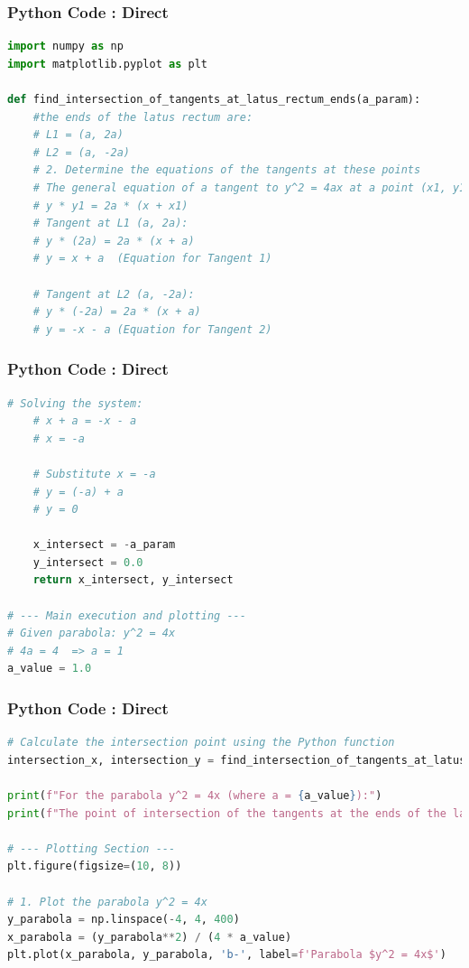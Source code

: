 \documentclass{beamer}
\begin{document}
\begin{frame}[fragile]
\frametitle{Python Code : Direct}
\begin{lstlisting}[language=Python]
import numpy as np
import matplotlib.pyplot as plt

def find_intersection_of_tangents_at_latus_rectum_ends(a_param):
    #the ends of the latus rectum are:
    # L1 = (a, 2a)
    # L2 = (a, -2a)
    # 2. Determine the equations of the tangents at these points
    # The general equation of a tangent to y^2 = 4ax at a point (x1, y1) is:
    # y * y1 = 2a * (x + x1)
    # Tangent at L1 (a, 2a):
    # y * (2a) = 2a * (x + a)
    # y = x + a  (Equation for Tangent 1)

    # Tangent at L2 (a, -2a):
    # y * (-2a) = 2a * (x + a)
    # y = -x - a (Equation for Tangent 2)
\end{lstlisting}
\end{frame}

\begin{frame}[fragile]
\frametitle{Python Code : Direct}
\begin{lstlisting}[language=Python]
    # Solving the system:
    # x + a = -x - a
    # x = -a

    # Substitute x = -a
    # y = (-a) + a
    # y = 0

    x_intersect = -a_param
    y_intersect = 0.0
    return x_intersect, y_intersect

# --- Main execution and plotting ---
# Given parabola: y^2 = 4x
# 4a = 4  => a = 1
a_value = 1.0
\end{lstlisting}
\end{frame}

\begin{frame}[fragile]
\frametitle{Python Code : Direct}
\begin{lstlisting}[language=Python]
# Calculate the intersection point using the Python function
intersection_x, intersection_y = find_intersection_of_tangents_at_latus_rectum_ends(a_value)

print(f"For the parabola y^2 = 4x (where a = {a_value}):")
print(f"The point of intersection of the tangents at the ends of the latus rectum is ({intersection_x:.2f}, {intersection_y:.2f})")

# --- Plotting Section ---
plt.figure(figsize=(10, 8))

# 1. Plot the parabola y^2 = 4x
y_parabola = np.linspace(-4, 4, 400)
x_parabola = (y_parabola**2) / (4 * a_value)
plt.plot(x_parabola, y_parabola, 'b-', label=f'Parabola $y^2 = 4x$')
\end{lstlisting}
\end{frame}
\end{document}
